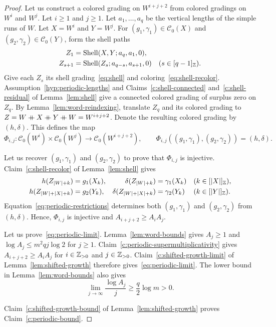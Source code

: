 \begin{proof}
 Let us construct a colored grading on $W^{i+j+2}$ from colored gradings on $W^i$ and $W^j$.
Let $i\ge1$ and $j\ge1$.
Let $a_1,\ldots,a_q$ be the vertical lengths of the simple runs of $W$.
Let $X=W^i$ and $Y=W^j$.
For $(g_1,\gamma_1)\in\mathcal C_0(X)$ and $(g_2,\gamma_2)\in\mathcal C_0(Y)$, form the shell paths
\[
\begin{aligned}
 Z_1&=\operatorname{Shell}(X,Y;a_q,a_1,0),\\
 Z_{s+1}&=\operatorname{Shell}(Z_s;a_{q-s},a_{s+1},0)
 \quad(s\in[q-1]_{\mathbb Z}).
\end{aligned}
\]
Give each $Z_s$ its shell grading~\eqref{eq:shell} and coloring~\eqref{eq:shell-recolor}.
Assumption~\ref{hyp:periodic-lengths} and Claims~\ref{c:shell-connected} and~\ref{c:shell-residual} of Lemma~\ref{lem:shell} give a connected colored grading of surplus zero on $Z_q$.
By Lemma~\ref{lem:word-reindexing}, translate $Z_q$ and its colored grading to
$Z=W\mathbin{+\mkern-10mu+} X\mathbin{+\mkern-10mu+} Y\mathbin{+\mkern-10mu+} W=W^{i+j+2}$. Denote the resulting colored grading by $(h,\delta)$.
This defines the map
\[
 \Phi_{i,j}\colon\mathcal C_0(W^i)\times\mathcal C_0(W^j)
 \longrightarrow\mathcal C_0(W^{i+j+2}),\qquad
 \Phi_{i,j}((g_1,\gamma_1),(g_2,\gamma_2))=(h,\delta).
\]

Let us recover $(g_1,\gamma_1)$ and $(g_2,\gamma_2)$ to prove that $\Phi_{i,j}$ is injective.
Claim~\ref{c:shell-recolor} of Lemma~\ref{lem:shell} gives
\begin{equation}\label{eq:periodic-restrictions}
\begin{aligned}
 h(Z_{|W|+k})&=g_1(X_k),&
 \delta(Z_{|W|+k})&=\gamma_1(X_k)
 &&(k\in[|X|]_{\mathbb Z}),\\
 h(Z_{|W|+|X|+k})&=g_2(Y_k),&
 \delta(Z_{|W|+|X|+k})&=\gamma_2(Y_k)
 &&(k\in[|Y|]_{\mathbb Z}).
\end{aligned}
\end{equation}
Equation~\eqref{eq:periodic-restrictions} determines both $(g_1,\gamma_1)$ and $(g_2,\gamma_2)$ from $(h,\delta)$.
Hence, $\Phi_{i,j}$ is injective and $A_{i+j+2}\ge A_iA_j$.

 Let us prove~\eqref{eq:periodic-limit}.
Lemma~\ref{lem:word-bounds} gives $A_j\ge1$ and $\log A_j\le m^2qj\log2$ for $j\ge1$.
Claim~\ref{c:periodic-supermultiplicativity} gives $A_{i+j+2}\ge A_iA_j$ for $i\in\mathbb Z_{>0}$ and $j\in\mathbb Z_{>0}$.
Claim~\ref{c:shifted-growth-limit} of Lemma~\ref{lem:shifted-growth} therefore gives~\eqref{eq:periodic-limit}.
The lower bound in Lemma~\ref{lem:word-bounds} also gives
\[
 \lim_{j\to\infty}\frac{\log A_j}{j}\ge\frac q2\log m>0.
\]

Claim~\ref{c:shifted-growth-bound} of Lemma~\ref{lem:shifted-growth} proves Claim~\ref{c:periodic-bound}.
\end{proof}

